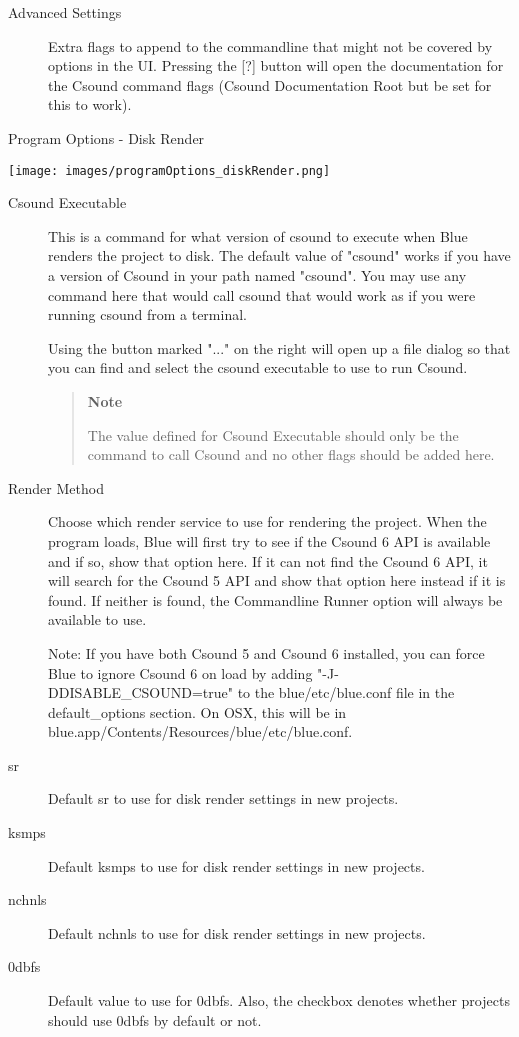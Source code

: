 \begin{description}
\item[Advanced Settings]
Extra flags to append to the commandline that might not be covered by
options in the UI. Pressing the {[}?{]} button will open the
documentation for the Csound command flags (Csound Documentation Root
but be set for this to work).
\end{description}

Program Options - Disk Render

\texttt{[image: images/programOptions\_diskRender.png]}

\begin{description}
\item[Csound Executable]
This is a command for what version of csound to execute when Blue
renders the project to disk. The default value of "csound" works if you
have a version of Csound in your path named "csound". You may use any
command here that would call csound that would work as if you were
running csound from a terminal.

Using the button marked "..." on the right will open up a file dialog so
that you can find and select the csound executable to use to run Csound.

\begin{quote}
\textbf{Note}

The value defined for Csound Executable should only be the command to
call Csound and no other flags should be added here.
\end{quote}
\item[Render Method]
Choose which render service to use for rendering the project. When the
program loads, Blue will first try to see if the Csound 6 API is
available and if so, show that option here. If it can not find the
Csound 6 API, it will search for the Csound 5 API and show that option
here instead if it is found. If neither is found, the Commandline Runner
option will always be available to use.

Note: If you have both Csound 5 and Csound 6 installed, you can force
Blue to ignore Csound 6 on load by adding "-J-DDISABLE\_CSOUND=true" to
the blue/etc/blue.conf file in the default\_options section. On OSX,
this will be in blue.app/Contents/Resources/blue/etc/blue.conf.
\item[sr]
Default sr to use for disk render settings in new projects.
\item[ksmps]
Default ksmps to use for disk render settings in new projects.
\item[nchnls]
Default nchnls to use for disk render settings in new projects.
\item[0dbfs]
Default value to use for 0dbfs. Also, the checkbox denotes whether
projects should use 0dbfs by default or not.
\end{description}

